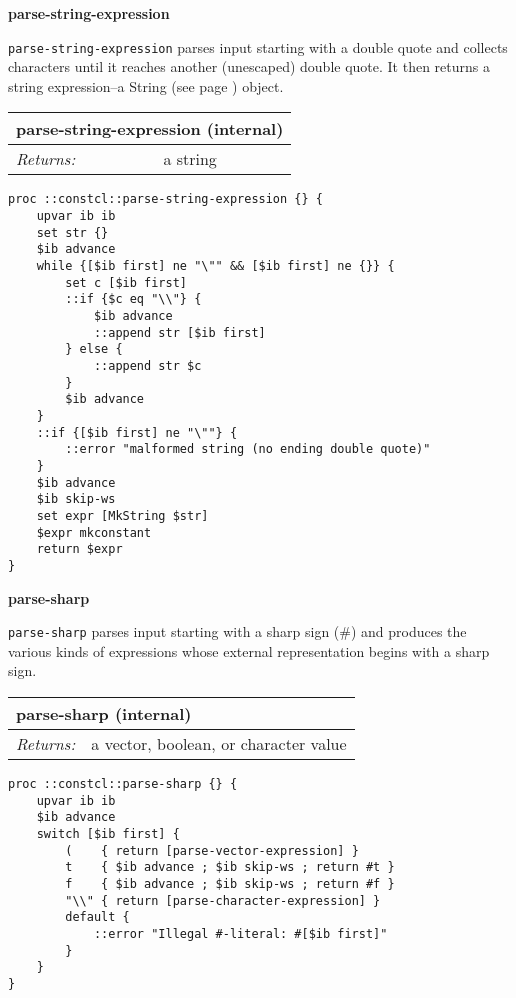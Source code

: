 \documentclass{report}
\begin{document}
\textbf{parse-string-expression}


\texttt{parse-string-expression} parses input starting with a double quote and collects characters until it reaches another (unescaped) double quote. It then returns a string expression--a String (see page \pageref{strings}) object.

\begin{tabular}{ |l l| }
\hline
\multicolumn{2}{|l|}{parse-string-expression (internal)} \\
\hline
\textit{Returns:} & a string \\
\hline
\end{tabular}

\noindent\makebox[\linewidth]{\rule{\linewidth}{0.4pt}}
\begin{lstlisting}
proc ::constcl::parse-string-expression {} {
    upvar ib ib
    set str {}
    $ib advance
    while {[$ib first] ne "\"" && [$ib first] ne {}} {
        set c [$ib first]
        ::if {$c eq "\\"} {
            $ib advance
            ::append str [$ib first]
        } else {
            ::append str $c
        }
        $ib advance
    }
    ::if {[$ib first] ne "\""} {
        ::error "malformed string (no ending double quote)"
    }
    $ib advance
    $ib skip-ws
    set expr [MkString $str]
    $expr mkconstant
    return $expr
}
\end{lstlisting}
\noindent\makebox[\linewidth]{\rule{\linewidth}{0.4pt}}

\textbf{parse-sharp}


\texttt{parse-sharp} parses input starting with a sharp sign (\#) and produces the various kinds of expressions whose external representation begins with a sharp sign.

\begin{tabular}{ |l l| }
\hline
\multicolumn{2}{|l|}{parse-sharp (internal)} \\
\hline
\textit{Returns:} & a vector, boolean, or character value \\
\hline
\end{tabular}

\noindent\makebox[\linewidth]{\rule{\linewidth}{0.4pt}}
\begin{lstlisting}
proc ::constcl::parse-sharp {} {
    upvar ib ib
    $ib advance
    switch [$ib first] {
        (    { return [parse-vector-expression] }
        t    { $ib advance ; $ib skip-ws ; return #t }
        f    { $ib advance ; $ib skip-ws ; return #f }
        "\\" { return [parse-character-expression] }
        default {
            ::error "Illegal #-literal: #[$ib first]"
        }
    }
}
\end{lstlisting}
\noindent\makebox[\linewidth]{\rule{\linewidth}{0.4pt}}
\end{document}

